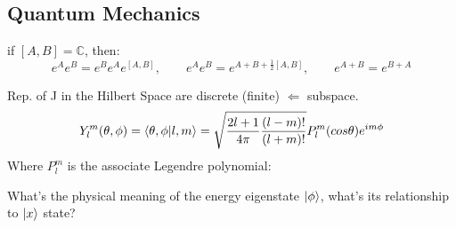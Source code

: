 \subsection{Quantum Mechanics}
\begin{description}[style=nextline]
    \item [Baker-Campbell-Hausdorff]	
	if $[A,B] = \mathbb{C}$, then:	\\
	$$ e^{A}e^{B} = e^{B}e^{A}e^{[A,B]}, \qquad 
	e^{A}e^{B} = e^{A+B+\frac{1}{2}[A,B]}, \qquad
	e^{A+B} = e^{B+A} $$
    \item [Angular Momentum] Rep. of J in the Hilbert Space are discrete
	(finite) $\Leftarrow$ subspace.
	$$Y^m_l(\theta,\phi) = \bra{\theta,\phi}\ket{l,m} =
	\sqrt{\frac{2l+1}{4\pi}\frac{(l-m)!}{(l+m)!}}P^m_l(cos\theta)e^{im\phi} $$
	Where $P_l^m$ is the associate Legendre polynomial:
    \item [Harmonic Oscillator]	What's the physical meaning of the energy
	eigenstate $\ket{\phi}$, what's its relationship to $\ket{x}$ state?
\end{description}

